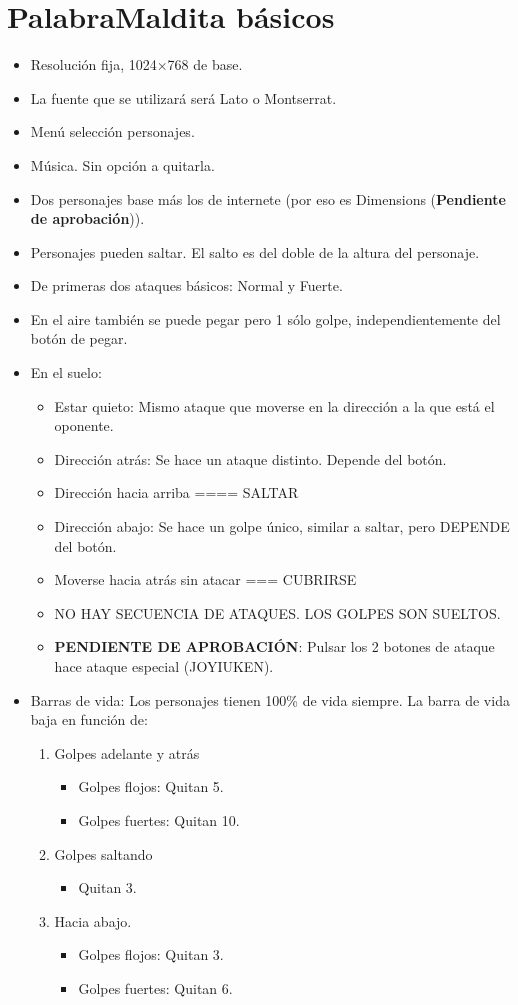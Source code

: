 \documentclass[10pt,a4paper,titlepage]{article}
\begin{document}
\section{PalabraMaldita básicos}
\begin{itemize}
	\item Resolución fija, 1024×768 de base.
	\item La fuente que se utilizará será Lato o Montserrat.
	\item Menú selección personajes.
	\item Música. Sin opción a quitarla.
	\item Dos personajes base más los de internete (por eso es Dimensions (\textbf{Pendiente de aprobación})).
	\item Personajes pueden saltar. El salto es del doble de la altura del personaje.
	\item De primeras dos ataques básicos: Normal y Fuerte.
	\item En el aire también se puede pegar pero 1 sólo golpe, independientemente del botón de pegar.
	\item En el suelo:
	\begin{itemize}
		\item Estar quieto: Mismo ataque que moverse en la dirección a la que está el oponente.
		\item Dirección atrás: Se hace un ataque distinto. Depende del botón.
		\item Dirección hacia arriba ==== SALTAR
		\item Dirección abajo: Se hace un golpe único, similar a saltar, pero DEPENDE del botón.
		\item Moverse hacia atrás sin atacar === CUBRIRSE
		\item NO HAY SECUENCIA DE ATAQUES. LOS GOLPES SON SUELTOS.
		\item \textbf{PENDIENTE DE APROBACIÓN}: Pulsar los 2 botones de ataque hace ataque especial (JOYIUKEN).
	\end{itemize}

	\item Barras de vida: Los personajes tienen 100\% de vida siempre. La barra de vida baja en función de:
	\begin{enumerate}
		\item Golpes adelante y atrás
		\begin{itemize}
			\item Golpes flojos: Quitan 5. 
			\item Golpes fuertes: Quitan 10.
		\end{itemize}
		\item Golpes saltando
		\begin{itemize}
			\item Quitan 3.
		\end{itemize} 
		\item Hacia abajo.
		\begin{itemize}
			\item Golpes flojos: Quitan 3. 
			\item Golpes fuertes: Quitan 6.
		\end{itemize}
	\end{enumerate}


\end{itemize}
\end{document}
